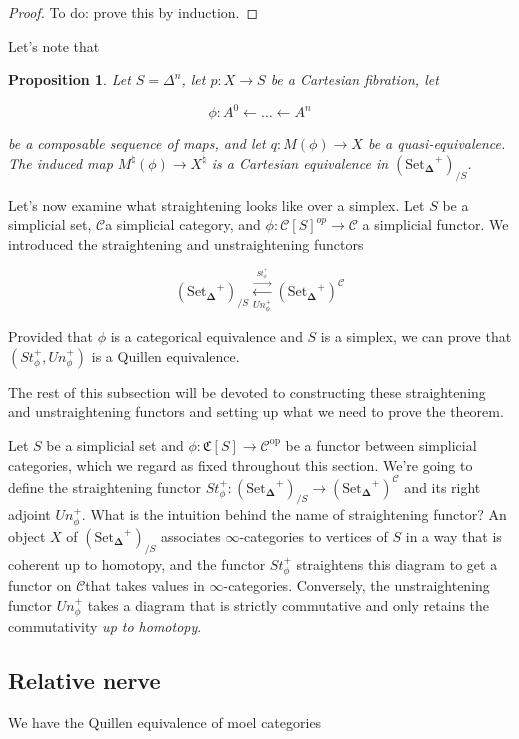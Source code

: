 \documentclass[12pt]{amsart}
\newcommand{\8}{\ensuremath{\infty}}
\newcommand{\C}{\ensuremath{\mathscr{C}}}
\newcommand{\SSet}{\ensuremath{\text{Set}_{\boldsymbol{\Delta}}}}
\newcommand{\op}[1]{\ensuremath{{#1}^{\text{op}}}}
\newcommand{\adj}[2]{\ensuremath{\overset{\overset{#1}{ \rightarrow}}{\underset{#2}{\leftarrow}}}}
\newtheorem{proposition}{Proposition}
\begin{document}
\begin{proof}
  To do: prove this by induction.
\end{proof}

Let's note that
\begin{proposition}
  Let $S=\Delta^n$, let $p:X\rightarrow S$ be a Cartesian fibration, let

  $$
    \phi:A^0\leftarrow\dots\leftarrow A^n
  $$

  be a composable sequence of maps, and let $q:M(\phi)\rightarrow X$ be a quasi-equivalence. The induced map $M^\natural(\phi)\rightarrow X^\natural$ is a Cartesian equivalence in $(\SSet^+)_{/S}$.
\end{proposition}

Let's now examine what straightening looks like over a simplex. Let $S$ be a simplicial set, \C a simplicial category, and $\phi:\mathscr{C}[S]^{op}\rightarrow \C$ a simplicial functor. We introduced the straightening and unstraightening functors

$$
  (\SSet^+)_{/S}\adj{St^+_\phi}{Un^+_\phi} (\SSet^+)^\C
$$

Provided that $\phi$ is a categorical equivalence and $S$ is a simplex, we can prove that $(St^+_\phi, Un^+_\phi)$ is a Quillen equivalence.

The rest of this subsection will be devoted to constructing these straightening and unstraightening functors and setting up what we need to prove the theorem.

Let $S$ be a simplicial set and $\phi: \mathfrak{C}[S] \rightarrow \op\C$ be a functor between simplicial categories, which we regard as fixed throughout this section. We're going to define the straightening functor $St_\phi^+: (\SSet^+)_{/S} \rightarrow (\SSet^+)^\C$ and its right adjoint $Un_\phi^+$. What is the intuition behind the name of straightening functor? An object $X$ of $(\SSet^+)_{/S}$ associates \8-categories to vertices of $S$ in a way that is coherent up to homotopy, and the functor $St_\phi^+$ straightens this diagram to get a functor on \C that takes values in \8-categories. Conversely, the unstraightening functor $Un_\phi^+$ takes a diagram that is strictly commutative and only retains the commutativity \emph{up to homotopy}.

\subsection{Relative nerve}

We have the Quillen equivalence of moel categories
\end{document}
